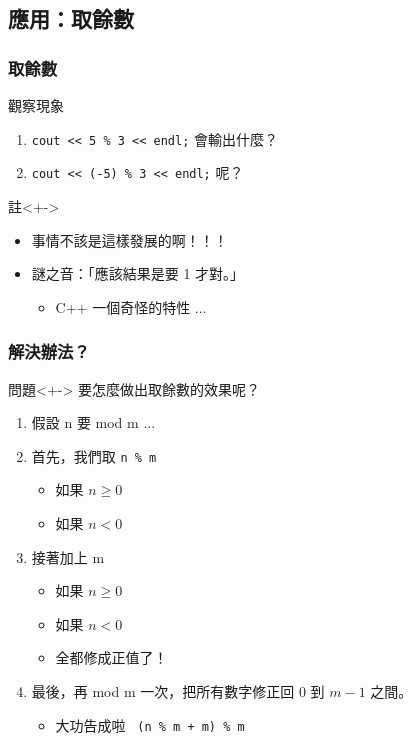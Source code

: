 \documentclass[utf8]{beamer}
\begin{document}
\begin{CJK}{UTF8}{bkai}
\subsection{應用：取餘數}

\begin{frame}[fragile]
  \frametitle{取餘數}
  \begin{block}{觀察現象}
    \begin{enumerate}[<+->]
    \item \lstinline{cout << 5 % 3 << endl;}{} 會輸出什麼？
    \item \lstinline{cout << (-5) % 3 << endl;}{} 呢？
    \end{enumerate}
  \end{block}
  \begin{exampleblock}{註}<+->
    \begin{itemize}
    \item 事情不該是這樣發展的啊！！！
    \item<+-> 謎之音：「應該結果是要 1 才對。」
      \begin{itemize}[<+->]
      \item C++ 一個\alert{奇怪的特性} ...
      \end{itemize}
    \end{itemize}
  \end{exampleblock}
\end{frame}

\begin{frame}[fragile]
  \frametitle{解決辦法？}
  \begin{block}{問題}<+->
  要怎麼做出取餘數的效果呢？
  \end{block}
  \begin{enumerate}[<+->]
  \item 假設 n 要 mod m ...
  \item 首先，我們取 \lstinline{n % m}{}
    \begin{itemize}[<+->]
    \item 如果 $n\geq{0}$
    \item 如果 $n<0$
    \end{itemize}
  \item 接著加上 m
    \begin{itemize}[<+->]
    \item 如果 $n\geq{0}$
    \item 如果 $n<0$
    \item 全都修成正值了！
    \end{itemize}
  \item 最後，再 mod m 一次，把所有數字修正回 $0$ 到 $m-1$ 之間。
    \begin{itemize}[<+->]
    \item 大功告成啦~ \lstinline{(n % m + m) % m}{}
    \end{itemize}
  \end{enumerate}
\end{frame}


\end{CJK}
\end{document}
